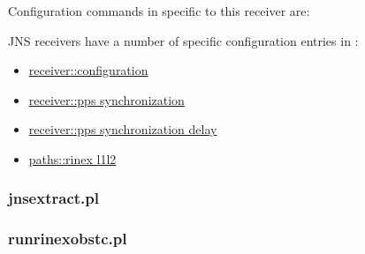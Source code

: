 Configuration commands in  specific to this receiver are:

JNS receivers have a number of specific configuration entries in :
\begin{itemize}
\item \hyperlink{h:configuration}{receiver::configuration}
\item \hyperlink{h:pps_synchronization}{receiver::pps synchronization}
\item \hyperlink{h:pps_synchronization_delay}{receiver::pps synchronization delay}
\item \hyperlink{h:rinex_l1l2}{paths::rinex l1l2}
\end{itemize}

\subsubsection{jnsextract.pl}
\hypertarget{h:jnsextract}{}

\subsubsection{runrinexobstc.pl}
